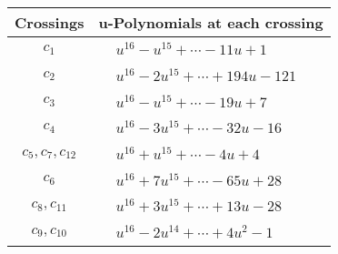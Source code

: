 \documentclass[1p]{elsarticle_modified}
\theoremstyle{definition}
\begin{document}
\begin{tabular}{m{50pt}|m{274pt}}
Crossings & \hspace{64pt}u-Polynomials at each crossing \\
\hline $$\begin{aligned}c_{1}\end{aligned}$$&$\begin{aligned}
&u^{16}- u^{15}+\cdots-11 u+1
\end{aligned}$\\
\hline $$\begin{aligned}c_{2}\end{aligned}$$&$\begin{aligned}
&u^{16}-2 u^{15}+\cdots+194 u-121
\end{aligned}$\\
\hline $$\begin{aligned}c_{3}\end{aligned}$$&$\begin{aligned}
&u^{16}- u^{15}+\cdots-19 u+7
\end{aligned}$\\
\hline $$\begin{aligned}c_{4}\end{aligned}$$&$\begin{aligned}
&u^{16}-3 u^{15}+\cdots-32 u-16
\end{aligned}$\\
\hline $$\begin{aligned}c_{5},c_{7},c_{12}\end{aligned}$$&$\begin{aligned}
&u^{16}+u^{15}+\cdots-4 u+4
\end{aligned}$\\
\hline $$\begin{aligned}c_{6}\end{aligned}$$&$\begin{aligned}
&u^{16}+7 u^{15}+\cdots-65 u+28
\end{aligned}$\\
\hline $$\begin{aligned}c_{8},c_{11}\end{aligned}$$&$\begin{aligned}
&u^{16}+3 u^{15}+\cdots+13 u-28
\end{aligned}$\\
\hline $$\begin{aligned}c_{9},c_{10}\end{aligned}$$&$\begin{aligned}
&u^{16}-2 u^{14}+\cdots+4 u^2-1
\end{aligned}$\\
\hline
\end{tabular}\\~\\
\end{document}
